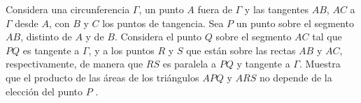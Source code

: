 Considera una circunferencia $\Gamma$, un punto $A$ fuera de $\Gamma$ y las tangentes $AB$, $AC$ a $\Gamma$ desde
$A$, con $B$ y $C$ los puntos de tangencia. Sea $P$ un punto sobre el segmento $AB$, distinto de
$A$ y de $B$. Considera el punto $Q$ sobre el segmento $AC$ tal que $P Q$ es tangente a $\Gamma$, y a los
puntos $R$ y $S$ que están sobre las rectas $AB$ y $AC$, respectivamente, de manera que $RS$
es paralela a $P Q$ y tangente a $\Gamma$. Muestra que el producto de las áreas de los triángulos
$APQ$ y $ARS$ no depende de la elección del punto $P$ .
